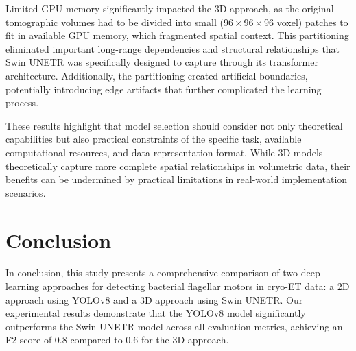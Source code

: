 \documentclass{article}
\begin{document}
Limited GPU memory significantly impacted the 3D approach, as the original tomographic volumes had to be divided into small ($96 \times 96 \times 96$ voxel) patches to fit in available GPU memory, which fragmented spatial context. This partitioning eliminated important long-range dependencies and structural relationships that Swin UNETR was specifically designed to capture through its transformer architecture. Additionally, the partitioning created artificial boundaries, potentially introducing edge artifacts that further complicated the learning process.



These results highlight that model selection should consider not only theoretical capabilities but also practical constraints of the specific task, available computational resources, and data representation format. While 3D models theoretically capture more complete spatial relationships in volumetric data, their benefits can be undermined by practical limitations in real-world implementation scenarios.



\section{Conclusion}
\label{sec:conc}

In conclusion, this study presents a comprehensive comparison of two deep learning approaches for detecting bacterial flagellar motors in cryo-ET data: a 2D approach using YOLOv8 and a 3D approach using Swin UNETR. Our experimental results demonstrate that the YOLOv8 model significantly outperforms the Swin UNETR model across all evaluation metrics, achieving an F2-score of 0.8 compared to 0.6 for the 3D approach.
\end{document}
